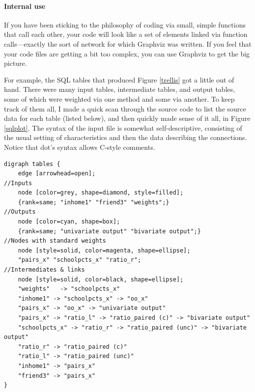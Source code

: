 \paragraph{Internal use}
If you have been sticking to the philosophy of coding via small,
simple functions that call each other, your code will look like a set
of elements linked via function calls---exactly the sort of network for
which Graphviz was written. If you feel that your code files are getting
a bit too complex, you can use Graphviz to get the big picture.

For example, the SQL tables that produced Figure
\ref{trellis} got a little out of hand. There were many input tables,
intermediate tables, and output tables, some of which were weighted
via one method and some via another. To keep track of them all, I made
a quick scan through the source code to list the source data for each
table (listed below), and then  quickly made sense of it all,
in Figure \ref{sqlplot}.  The syntax of the input file is somewhat
self-descriptive, consisting of the usual setting of characteristics
and then the data describing the connections. Notice that dot's syntax
allows C-style comments.

\begin{lstlisting}
digraph tables {
    edge [arrowhead=open];
//Inputs
    node [color=grey, shape=diamond, style=filled];
    {rank=same; "inhome1" "friend3" "weights";}
//Outputs
    node [color=cyan, shape=box];
    {rank=same; "univariate output" "bivariate output";}
//Nodes with standard weights
    node [style=solid, color=magenta, shape=ellipse];
    "pairs_x" "schoolpcts_x" "ratio_r";
//Intermediates & links
    node [style=solid, color=black, shape=ellipse];
    "weights"   -> "schoolpcts_x" 
    "inhome1" -> "schoolpcts_x" -> "oo_x" 
    "pairs_x" -> "oo_x" -> "univariate output"
    "pairs_x" -> "ratio_l" -> "ratio_paired (c)" -> "bivariate output"
    "schoolpcts_x" -> "ratio_r" -> "ratio_paired (unc)" -> "bivariate output"
    "ratio_r" -> "ratio_paired (c)"
    "ratio_l" -> "ratio_paired (unc)"
    "inhome1" -> "pairs_x" 
    "friend3" -> "pairs_x" 
}
\end{lstlisting}

